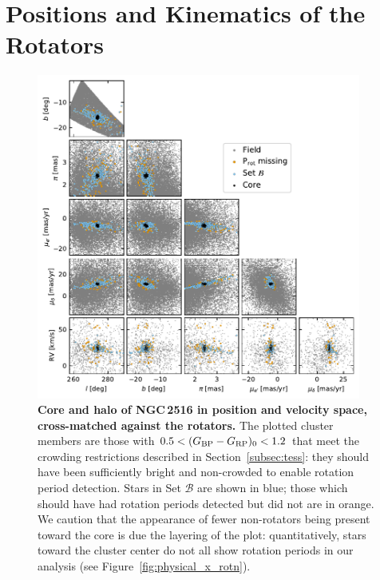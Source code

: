 \documentclass[12pt,twocolumn,tighten]{aastex63}
\newcommand{\bpmrpo}{(G_{\rm BP}-G_{\rm RP})_0}
\begin{document}
\section{Positions and Kinematics of the Rotators}
\label{app:gaia6d_x_rotn}

\begin{figure}[tp]
	\begin{center}
		\leavevmode
		\includegraphics[width=0.95\textwidth]{f15.pdf}
	\end{center}
	\vspace{-0.7cm}
  \caption{ {\bf Core and halo of NGC\,2516 in position and
  velocity space, cross-matched against the rotators.} The plotted
  cluster members are those with $0.5<\bpmrpo<1.2$ that meet the
  crowding restrictions described in Section~\ref{subsec:tess}: they
  should have been sufficiently bright and non-crowded to enable
  rotation period detection. Stars in Set $\mathcal{B}$ are shown in blue; those which should have
  had rotation periods detected but did not are in orange.
  We caution that the appearance of fewer
  non-rotators being present toward the core is due the layering of
  the plot: quantitatively, stars toward the cluster center do not all
  show rotation periods in our analysis (see
  Figure~\ref{fig:physical_x_rotn}).
  \label{fig:gaia6d_x_rotn}
	}
\end{figure}
\end{document}
